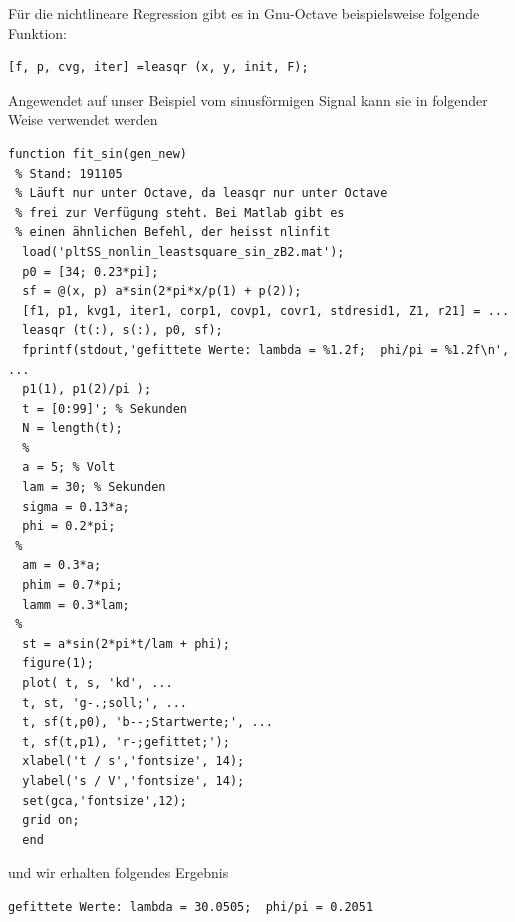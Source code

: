 Für die nichtlineare Regression gibt es in Gnu-Octave  beispielsweise folgende
Funktion:
\begin{verbatim}
[f, p, cvg, iter] =leasqr (x, y, init, F);
\end{verbatim}
Angewendet auf unser Beispiel vom sinusförmigen Signal kann sie in folgender Weise
verwendet werden
\begin{verbatim}
function fit_sin(gen_new)
 % Stand: 191105
 % Läuft nur unter Octave, da leasqr nur unter Octave
 % frei zur Verfügung steht. Bei Matlab gibt es
 % einen ähnlichen Befehl, der heisst nlinfit
  load('pltSS_nonlin_leastsquare_sin_zB2.mat');
  p0 = [34; 0.23*pi];
  sf = @(x, p) a*sin(2*pi*x/p(1) + p(2));
  [f1, p1, kvg1, iter1, corp1, covp1, covr1, stdresid1, Z1, r21] = ...
  leasqr (t(:), s(:), p0, sf);
  fprintf(stdout,'gefittete Werte: lambda = %1.2f;  phi/pi = %1.2f\n', ...
  p1(1), p1(2)/pi );
  t = [0:99]'; % Sekunden
  N = length(t);
  %
  a = 5; % Volt
  lam = 30; % Sekunden
  sigma = 0.13*a;
  phi = 0.2*pi;
 %
  am = 0.3*a;
  phim = 0.7*pi;
  lamm = 0.3*lam;
 %
  st = a*sin(2*pi*t/lam + phi);
  figure(1);
  plot( t, s, 'kd', ...
  t, st, 'g-.;soll;', ...
  t, sf(t,p0), 'b--;Startwerte;', ...
  t, sf(t,p1), 'r-;gefittet;');
  xlabel('t / s','fontsize', 14);
  ylabel('s / V','fontsize', 14);
  set(gca,'fontsize',12);
  grid on;
  end
\end{verbatim}
und wir erhalten folgendes Ergebnis
\begin{verbatim}
gefittete Werte: lambda = 30.0505;  phi/pi = 0.2051
\end{verbatim}

\newpage
